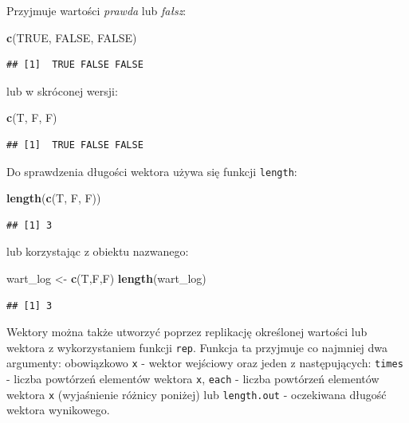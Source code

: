 \documentclass[]{book}
\newenvironment{Shaded}{\begin{snugshade}}{\end{snugshade}}
\newcommand{\KeywordTok}[1]{\textcolor[rgb]{0.13,0.29,0.53}{\textbf{#1}}}
\newcommand{\StringTok}[1]{\textcolor[rgb]{0.31,0.60,0.02}{#1}}
\newcommand{\OtherTok}[1]{\textcolor[rgb]{0.56,0.35,0.01}{#1}}
\newcommand{\NormalTok}[1]{#1}
\begin{document}
Przyjmuje wartości \emph{prawda} lub \emph{fałsz}:

\begin{Shaded}
\begin{Highlighting}[]
\KeywordTok{c}\NormalTok{(}\OtherTok{TRUE}\NormalTok{, }\OtherTok{FALSE}\NormalTok{, }\OtherTok{FALSE}\NormalTok{)}
\end{Highlighting}
\end{Shaded}

\begin{verbatim}
## [1]  TRUE FALSE FALSE
\end{verbatim}

lub w skróconej wersji:

\begin{Shaded}
\begin{Highlighting}[]
\KeywordTok{c}\NormalTok{(T, F, F)}
\end{Highlighting}
\end{Shaded}

\begin{verbatim}
## [1]  TRUE FALSE FALSE
\end{verbatim}

Do sprawdzenia długości wektora używa się funkcji \texttt{length}:

\begin{Shaded}
\begin{Highlighting}[]
\KeywordTok{length}\NormalTok{(}\KeywordTok{c}\NormalTok{(T, F, F))}
\end{Highlighting}
\end{Shaded}

\begin{verbatim}
## [1] 3
\end{verbatim}

lub korzystając z obiektu nazwanego:

\begin{Shaded}
\begin{Highlighting}[]
\NormalTok{wart_log <-}\StringTok{ }\KeywordTok{c}\NormalTok{(T,F,F)}
\KeywordTok{length}\NormalTok{(wart_log)}
\end{Highlighting}
\end{Shaded}

\begin{verbatim}
## [1] 3
\end{verbatim}

Wektory można także utworzyć poprzez replikację określonej wartości lub
wektora z wykorzystaniem funkcji \texttt{rep}. Funkcja ta przyjmuje co
najmniej dwa argumenty: obowiązkowo \texttt{x} - wektor wejściowy oraz
jeden z następujących: \texttt{times} - liczba powtórzeń elementów
wektora \texttt{x}, \texttt{each} - liczba powtórzeń elementów wektora
\texttt{x} (wyjaśnienie różnicy poniżej) lub \texttt{length.out} -
oczekiwana długość wektora wynikowego.
\end{document}
